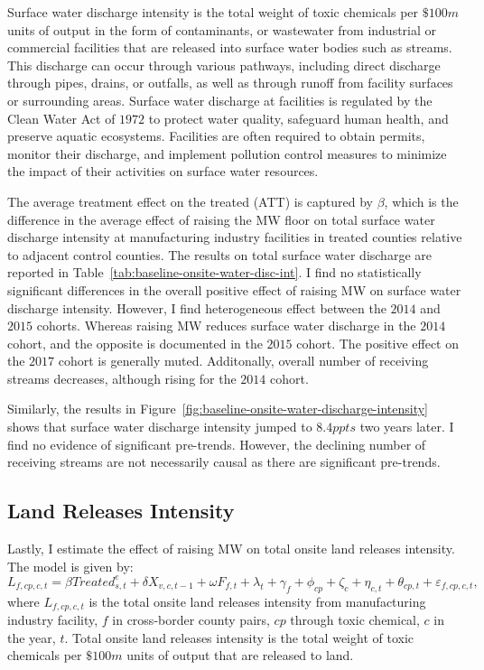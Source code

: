 \documentclass{C:/Users/david/OneDrive/Documents/ULMS/PhD/Thesis/chapter3/src/climate_change/latex/Economic_Journal/OUP-EJ}
\begin{document}
    Surface water discharge intensity is the total weight of toxic chemicals per $\$100m$ units of output in the form of contaminants, or wastewater from industrial or commercial facilities that are released into surface water bodies such as streams. This discharge can occur through various pathways, including direct discharge through pipes, drains, or outfalls, as well as through runoff from facility surfaces or surrounding areas. Surface water discharge at facilities is regulated by the Clean Water Act of $1972$ to protect water quality, safeguard human health, and preserve aquatic ecosystems. Facilities are often required to obtain permits, monitor their discharge, and implement pollution control measures to minimize the impact of their activities on surface water resources.
    

    The average treatment effect on the treated (ATT) is captured by $\beta$, which is the difference in the average effect of raising the MW floor on total surface water discharge intensity at manufacturing industry facilities in treated counties relative to adjacent control counties. The results on total surface water discharge are reported in Table~\ref{tab:baseline-onsite-water-disc-int}. I find no statistically significant differences in the overall positive effect of raising MW on surface water discharge intensity. However, I find heterogeneous effect between the $2014$ and $2015$ cohorts. Whereas raising MW reduces surface water discharge in the $2014$ cohort, and the opposite is documented in the $2015$ cohort. The positive effect on the $2017$ cohort is generally muted. Additonally, overall number of receiving streams decreases, although rising for the $2014$ cohort.

    Similarly, the results in Figure~\ref{fig:baseline-onsite-water-discharge-intensity} shows that surface water discharge intensity jumped to $8.4ppts$ two years later. I find no evidence of significant pre-trends. However, the declining number of receiving streams are not necessarily causal as there are significant pre-trends.
    

    \subsection{Land Releases Intensity}\label{subsec:land-releases-intensity}
    Lastly, I estimate the effect of raising MW on total onsite land releases intensity. The model is given by:
    \begin{equation}
        L_{f,cp,c,t} = \beta Treated_{s,t}^e + \delta X_{v,c,t-1} + \omega F_{f,t} + \lambda_{t} + \gamma_{f} + \phi_{cp} + \zeta_{c} + \eta_{c,t} + \theta_{cp,t} + \varepsilon_{f,cp,c,t},\label{eq:baseline-onsite-land-releases-intensity}
    \end{equation}
    where $L_{f,cp,c,t}$ is the total onsite land releases intensity from manufacturing industry facility, $f$ in cross-border county pairs, $cp$ through toxic chemical, $c$ in the year, $t$. Total onsite land releases intensity is the total weight of toxic chemicals per $\$100m$ units of output that are released to land.
    
\end{document}
